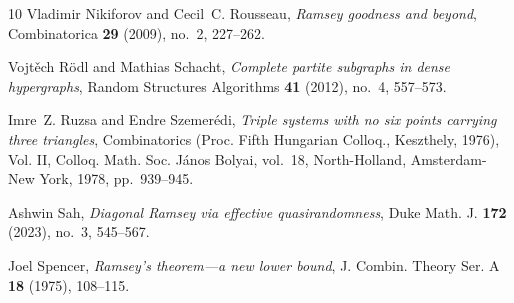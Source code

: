 \documentclass[11pt]{article}
\numberwithin{equation}{section}
\theoremstyle{plain}
\theoremstyle{remark}
\begin{document}
\begin{thebibliography}{10}
Vladimir Nikiforov and Cecil~C. Rousseau, \emph{Ramsey goodness and beyond},
  Combinatorica \textbf{29} (2009), no.~2, 227--262. 

Vojt\v{e}ch R\"{o}dl and Mathias Schacht, \emph{Complete partite subgraphs in
  dense hypergraphs}, Random Structures Algorithms \textbf{41} (2012), no.~4,
  557--573. 

Imre~Z. Ruzsa and Endre Szemer\'{e}di, \emph{Triple systems with no six points
  carrying three triangles}, Combinatorics ({P}roc. {F}ifth {H}ungarian
  {C}olloq., {K}eszthely, 1976), {V}ol. {II}, Colloq. Math. Soc. J\'{a}nos
  Bolyai, vol.~18, North-Holland, Amsterdam-New York, 1978, pp.~939--945.

Ashwin Sah, \emph{Diagonal {R}amsey via effective quasirandomness}, Duke Math.
  J. \textbf{172} (2023), no.~3, 545--567. 

Joel Spencer, \emph{Ramsey's theorem---a new lower bound}, J. Combin. Theory
  Ser. A \textbf{18} (1975), 108--115. 

\end{thebibliography}
\end{document}
